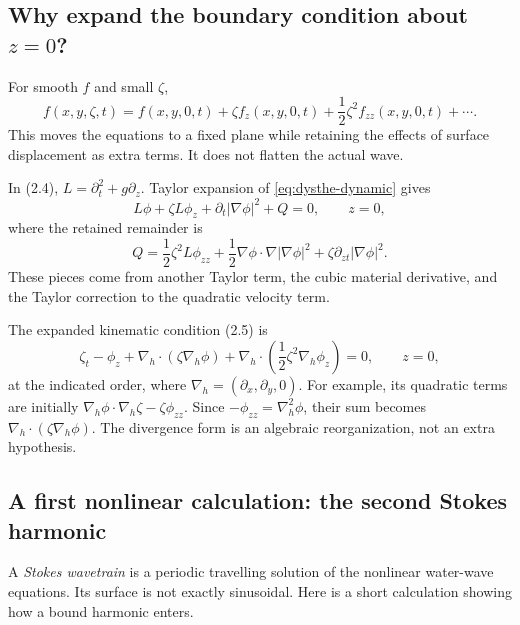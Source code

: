 \subsection{Why expand the boundary condition about $z=0$?}
For smooth $f$ and small $\zeta$,
\begin{equation}\label{eq:boundary-taylor}
 f(x,y,\zeta,t)=f(x,y,0,t)+\zeta f_z(x,y,0,t)
 +\frac12\zeta^2 f_{zz}(x,y,0,t)+\cdots.
\end{equation}
This moves the equations to a fixed plane while retaining the effects of
surface displacement as extra terms. It does not flatten the actual wave.

In (2.4), $L=\partial_t^2+g\partial_z$. Taylor expansion of
\eqref{eq:dysthe-dynamic} gives
\[
 L\phi+\zeta L\phi_z+\partial_t|\nabla\phi|^2+Q=0,
 \qquad z=0,
\]
where the retained remainder is
\[
 Q=\frac12\zeta^2L\phi_{zz}
 +\frac12\nabla\phi\cdot\nabla|\nabla\phi|^2
 +\zeta\partial_{zt}|\nabla\phi|^2.
\]
These pieces come from another Taylor term, the cubic material derivative,
and the Taylor correction to the quadratic velocity term.

The expanded kinematic condition (2.5) is
\[
 \zeta_t-\phi_z+\nabla_h\cdot(\zeta\nabla_h\phi)
 +\nabla_h\cdot\left(\frac12\zeta^2\nabla_h\phi_z\right)=0,
 \qquad z=0,
\]
at the indicated order, where $\nabla_h=(\partial_x,\partial_y,0)$.
For example, its quadratic terms are initially
$\nabla_h\phi\cdot\nabla_h\zeta-\zeta\phi_{zz}$.
Since $-\phi_{zz}=\nabla_h^2\phi$, their sum becomes
$\nabla_h\cdot(\zeta\nabla_h\phi)$. The divergence form is an algebraic
reorganization, not an extra hypothesis.

\subsection{A first nonlinear calculation: the second Stokes harmonic}
A \emph{Stokes wavetrain} is a periodic travelling solution of the nonlinear
water-wave equations. Its surface is not exactly sinusoidal. Here is a short
calculation showing how a bound harmonic enters.

